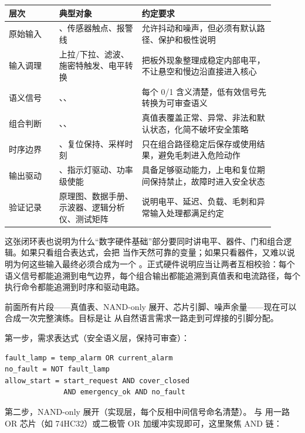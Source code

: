 \begin{longtable}{L{0.17\linewidth}L{0.28\linewidth}L{0.45\linewidth}}
\toprule
层次 & 典型对象 & 约定要求 \\
\midrule
原始输入 & 、传感器触点、报警线 & 允许抖动和噪声，但必须有默认路径、保护和极性说明 \\\tablerowrule
输入调理 & 上拉/下拉、滤波、施密特触发、电平转换 & 把板外现象整理成稳定内部电平，不让悬空和慢边沿直接进入核心 \\\tablerowrule
语义信号 & 、、 & 每个 0/1 含义清楚，低有效信号先转换为可审查语义 \\\tablerowrule
组合判断 & 、、 & 真值表覆盖正常、异常、非法和默认状态，化简不破坏安全策略 \\\tablerowrule
时序边界 & 、复位保持、采样时刻 & 只在组合路径稳定后保存或使用结果，避免毛刺进入危险动作 \\\tablerowrule
输出驱动 & 、指示灯驱动、功率级使能 & 具备足够驱动能力，上电和复位期间保持禁止，故障时进入安全状态 \\\tablerowrule
验证记录 & 原理图、数据手册、示波器、逻辑分析仪、测试矩阵 & 说明电平、延迟、负载、毛刺和异常输入处理都满足约定 \\
\bottomrule
\end{longtable}

这张闭环表也说明为什么“数字硬件基础”部分要同时讲电平、器件、门和组合逻辑。如果只看组合表达式，会把  当作天然可靠的变量；如果只看器件，又难以说明为何这些输入最终必须合成为一个 。正式硬件说明应当让两者互相校验：每个语义信号都能追溯到电气边界，每个组合输出都能追溯到真值表和电流路径，每个执行命令都能追溯到时序和驱动电路。

前面所有片段——真值表、NAND-only 展开、芯片引脚、噪声余量——现在可以合成一次完整演练。目标是让  从自然语言需求一路走到可焊接的引脚分配。

第一步，需求表达式（安全语义层，保持可审查）：

\begin{lstlisting}
fault_lamp = temp_alarm OR current_alarm
no_fault = NOT fault_lamp
allow_start = start_request AND cover_closed
              AND emergency_ok AND no_fault
\end{lstlisting}

第二步，NAND-only 展开（实现层，每个反相中间信号命名清楚）。 与  用一路 OR 芯片（如 74HC32）或二极管 OR 加缓冲实现即可，这里聚焦 AND 链：


